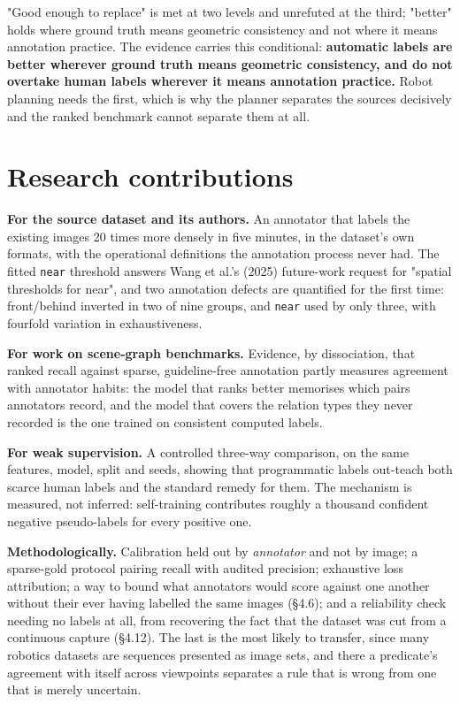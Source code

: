 "Good enough to replace" is met at two levels and unrefuted at the third; "better" holds where ground truth means geometric consistency and not where it means annotation practice. The evidence carries this conditional: \textbf{automatic labels are better wherever ground truth means geometric consistency, and do not overtake human labels wherever it means annotation practice.} Robot planning needs the first, which is why the planner separates the sources decisively and the ranked benchmark cannot separate them at all.

\section{Research contributions}

\textbf{For the source dataset and its authors.} An annotator that labels the existing images 20 times more densely in five minutes, in the dataset's own formats, with the operational definitions the annotation process never had. The fitted \texttt{near} threshold answers Wang et al.'s (2025) future-work request for "spatial thresholds for near", and two annotation defects are quantified for the first time: front/behind inverted in two of nine groups, and \texttt{near} used by only three, with fourfold variation in exhaustiveness.

\textbf{For work on scene-graph benchmarks.} Evidence, by dissociation, that ranked recall against sparse, guideline-free annotation partly measures agreement with annotator habits: the model that ranks better memorises which pairs annotators record, and the model that covers the relation types they never recorded is the one trained on consistent computed labels.

\textbf{For weak supervision.} A controlled three-way comparison, on the same features, model, split and seeds, showing that programmatic labels out-teach both scarce human labels and the standard remedy for them. The mechanism is measured, not inferred: self-training contributes roughly a thousand confident negative pseudo-labels for every positive one.

\textbf{Methodologically.} Calibration held out by \textit{annotator} and not by image; a sparse-gold protocol pairing recall with audited precision; exhaustive loss attribution; a way to bound what annotators would score against one another without their ever having labelled the same images (\S{}4.6); and a reliability check needing no labels at all, from recovering the fact that the dataset was cut from a continuous capture (\S{}4.12). The last is the most likely to transfer, since many robotics datasets are sequences presented as image sets, and there a predicate's agreement with itself across viewpoints separates a rule that is wrong from one that is merely uncertain.

